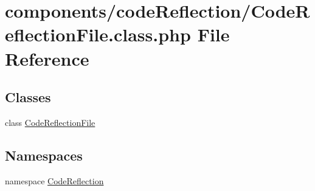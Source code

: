 \hypertarget{_code_reflection_file_8class_8php}{
\section{components/codeReflection/CodeReflectionFile.class.php File Reference}
\label{_code_reflection_file_8class_8php}
}
\subsection*{Classes}
\begin{CompactItemize}
\item 
class \hyperlink{class_code_reflection_file}{CodeReflectionFile}
\end{CompactItemize}
\subsection*{Namespaces}
\begin{CompactItemize}
\item 
namespace \hyperlink{namespace_code_reflection}{CodeReflection}
\end{CompactItemize}
